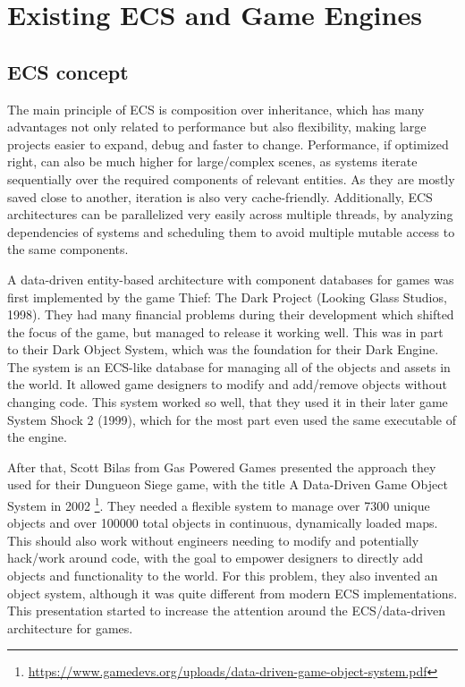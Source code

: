 \chapter{Existing ECS and Game Engines}\label{chap:existing}

\section{ECS concept}

The main principle of ECS is composition over inheritance, which has many advantages not only related to performance but also flexibility, making large projects easier to expand, debug and faster to change. Performance, if optimized right, can also be much higher for large/complex scenes, as systems iterate sequentially over the required components of relevant entities. As they are mostly saved close to another, iteration is also very cache-friendly. Additionally, ECS architectures can be parallelized very easily across multiple threads, by analyzing dependencies of systems and scheduling them to avoid multiple mutable access to the same components.

A data-driven entity-based architecture with component databases for games was first implemented by the game \textsf{Thief: The Dark Project} (Looking Glass Studios, 1998). They had many financial problems during their development which shifted the focus of the game, but managed to release it working well. This was in part to their \textsf{Dark Object System}, which was the foundation for their \textsf{Dark Engine}. The system is an ECS-like database for managing all of the objects and assets in the world. It allowed game designers to modify and add/remove objects without changing code. This system worked so well, that they used it in their later game \textsf{System Shock 2} (1999), which for the most part even used the same executable of the engine.

After that, Scott Bilas from \textsf{Gas Powered Games} presented the approach they used for their \textsf{Dungueon Siege} game, with the title \textsf{A Data-Driven Game Object System} in 2002 \footnote{\url{https://www.gamedevs.org/uploads/data-driven-game-object-system.pdf}}. They needed a flexible system to manage over 7300 unique objects and over 100000 total objects in continuous, dynamically loaded maps. This should also work without engineers needing to modify and potentially hack/work around code, with the goal to empower designers to directly add objects and functionality to the world. For this problem, they also invented an object system, although it was quite different from modern ECS implementations. This presentation started to increase the attention around the ECS/data-driven architecture for games.

